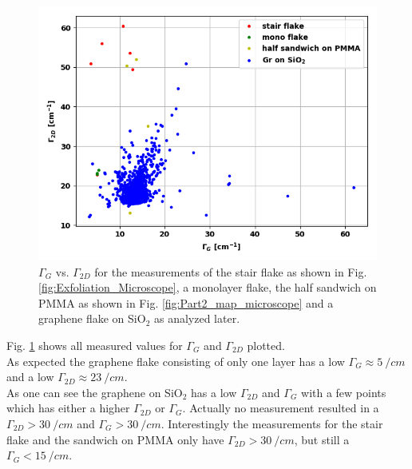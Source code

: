 \documentclass[12pt,a4paper]{article}
\begin{document}
\begin{figure}
\centering
\includegraphics[scale=0.55]{Bilder/Part_3/gamma_2D_vs_G.PNG}
\caption{$\Gamma _G$ vs. $\Gamma _{2D}$ for the measurements of the stair flake as shown in Fig. \ref{fig:Exfoliation_Microscope}, a monolayer flake, the half sandwich on PMMA as shown in Fig. \ref{fig:Part2_map_microscope} and a graphene flake on SiO$_2$ as analyzed later.}
\label{fig:Part3_gamma_G_vs_2D}
\end{figure}

Fig. \ref{fig:Part3_gamma_G_vs_2D} shows all measured values for $\Gamma _G$ and $\Gamma _{2D}$ plotted. \\ 
As expected the graphene flake consisting of only one layer has a low $\Gamma _G \approx \SI{5}{\per cm}$ and a low $\Gamma _{2D} \approx \SI{23}{\per cm}$. \\
As one can see the graphene on SiO$_2$ has a low $\Gamma _{2D}$ and $\Gamma _G$ with a few points which has either a higher $\Gamma _{2D}$ or $\Gamma _G$. Actually no measurement resulted in a $\Gamma _{2D} > \SI{30}{\per cm}$ and $\Gamma _G > \SI{30}{\per cm}$. Interestingly the measurements for the stair flake and the sandwich on PMMA only have $\Gamma _{2D} > \SI{30}{\per cm}$, but still a $\Gamma _G < \SI{15}{\per cm}$.
\end{document}
